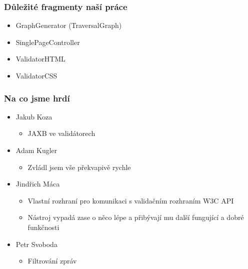 \documentclass{beamer}
\begin{document}
\begin{frame}[allowframebreaks]\frametitle{Důležité fragmenty naší práce}
  \begin{itemize}
    \item GraphGenerator (TraversalGraph)
		\item SinglePageController
		\item ValidatorHTML
		\item ValidatorCSS
  \end{itemize}
\end{frame}

\begin{frame}[allowframebreaks]\frametitle{Na co jsme hrdí} 
  \begin{itemize}
    \item Jakub Koza
      \begin{itemize}
       \item JAXB ve validátorech
     \end{itemize}
   
    \item Adam Kugler
      \begin{itemize}
       \item Zvládl jsem vše překvapivě rychle
     \end{itemize}

    \item Jindřich Máca
      \begin{itemize}
       \item Vlastní rozhraní pro komunikaci s validačním rozhraním W3C API
			 \item Nástroj vypadá zase o něco lépe a přibývají mu další fungující a dobré funkčnosti
      \end{itemize}  
   
    \item Petr Svoboda
      \begin{itemize}
       \item Filtrování zpráv
     \end{itemize}
   \end{itemize}  
\end{frame}
\end{document}
